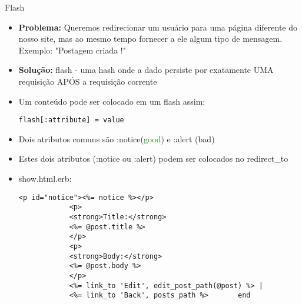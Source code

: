 \begin{frame}{Flash}
	\begin{itemize}
		\item \textbf{\alert{Problema:}} Queremos \alert{redirecionar} um usuário para uma página 
			diferente do nosso site, mas ao mesmo tempo \alert{fornecer} a ele algum tipo de mensagem.
			Exemplo: "Postagem criada !" 
		\item \textbf{\alert{Solução:}} flash - uma \alert{hash} onde a dado persiste por exatamente 
			\alert{UMA requisição APÓS} a requisição corrente
		\item Um conteúdo pode ser colocado em um flash assim:
		\begin{lstlisting}[style=RubyInputStyle, caption=controllers/posts\_controller.rb] 
			flash[:attribute] = value
		\end{lstlisting}		
		\item Dois atributos \alert{comuns} são \alert{:notice}(\textcolor{Green}{good}) e \alert{:alert}
			(\alert{bad})
		\item Estes dois atributos (:notice ou :alert) podem ser colocados no redirect\_to
		\item \alert{show.html.erb}:
		\begin{lstlisting}[style=RubyInputStyle, caption=views/posts/show.html.erb]
			<p id="notice"><%= notice %></p>
			<p>
			<strong>Title:</strong>
			<%= @post.title %>
			</p>
			<p>
			<strong>Body:</strong>
			<%= @post.body %>
			</p>
			<%= link_to 'Edit', edit_post_path(@post) %> |
			<%= link_to 'Back', posts_path %>		end 
		\end{lstlisting}		
	\end{itemize}	
\end{frame}